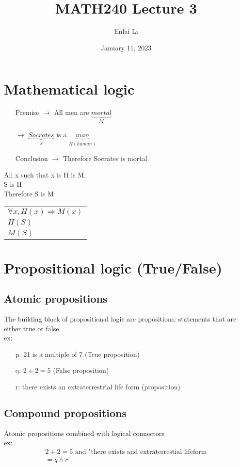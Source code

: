 \documentclass{article}
\author{Enlai Li}
\title{MATH240 \textendash{} Lecture 3}
\date{January 11, 2023}
\begin{document}
\maketitle
\section{Mathematical logic}
\begin{itemize}
    \item [Premise $\rightarrow $] All men are $\underbrace{mortal}_{M}$
    \item [$\rightarrow $] $\underbrace{Socrates}_S$ is a $\underbrace{man}_{H (human)}$
    \item [Conclusion $\rightarrow $] Therefore Socrates is mortal
\end{itemize}
All x such that x is H is M.\\ S is H\\ Therefore S is M
\begin{table}[h!]
    \begin{center}
        \begin{tabular}{l}
            $\forall x, H(x) \Rightarrow M(x)$ \\
            $H(S)$                             \\
            \hline{}
            $M(S)$                             \\
        \end{tabular}
    \end{center}
\end{table}

\section{Propositional logic (True/False)}
\subsection{Atomic propositions}
The building block of propositional logic are propositions: statements that are either true or false. \\
ex:
\begin{itemize}
    \item [p:] 21 is a multiple of 7 (True proposition)
    \item [q:] $2+2=5$ (False proposition)
    \item [r:] there exists an extraterrestrial life form (proposition)
\end{itemize}
\subsection{Compound propositions}
Atomic propositions combined with logical connectors \\ ex:
\begin{gather*}
    2+2=5 \text{ and } \text{"there exists and extraterrestial lifeform}\\
    = q \land r
\end{gather*}
\end{document}

